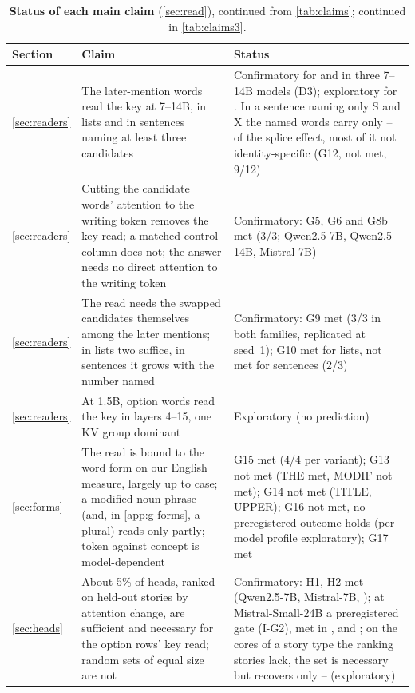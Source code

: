 \begin{table}[p]
\centering
\footnotesize
\caption{\textbf{Status of each main claim} (\cref{sec:read}), continued from \cref{tab:claims}; continued in \cref{tab:claims3}.}
\label{tab:claims2}
\begin{tabular}{p{}p{}p{}}
\toprule
Section & Claim & Status \\
\midrule
\cref{sec:readers} & The later-mention words read the key at 7--14B, in lists and in sentences naming at least three candidates & Confirmatory for \fmtOpt{} and \fmtPost{} in three 7--14B models (D3); exploratory for \fmtLetter{}. In a sentence naming only S and X the named words carry only \GtwelveStwoQwenFourteen{}--\GtwelveStwoQwenSeven{} of the splice effect, most of it not identity-specific (G12, not met, 9/12) \\
\cref{sec:readers} & Cutting the candidate words' attention to the writing token removes the key read; a matched control column does not; the answer needs no direct attention to the writing token & Confirmatory: G5, G6 and G8b met (3/3; Qwen2.5-7B, Qwen2.5-14B, Mistral-7B) \\
\cref{sec:readers} & The read needs the swapped candidates themselves among the later mentions; in lists two suffice, in sentences it grows with the number named & Confirmatory: G9 met (3/3 in both families, replicated at seed~1); G10 met for lists, not met for sentences (2/3) \\
\cref{sec:readers} & At 1.5B, option words read the key in layers 4--15, one KV group dominant & Exploratory (no prediction) \\
\cref{sec:forms} & The read is bound to the word form on our English measure, largely up to case; a modified noun phrase (and, in \cref{app:g-forms}, a plural) reads only partly; token against concept is model-dependent & G15 met (4/4 per variant); G13 not met (THE met, MODIF not met); G14 not met (TITLE, UPPER); G16 not met, no preregistered outcome holds (per-model profile exploratory); G17 met \\
\cref{sec:heads} & About 5\% of heads, ranked on held-out stories by attention change, are sufficient and necessary for the option rows' key read; random sets of equal size are not & Confirmatory: H1, H2 met (Qwen2.5-7B, Mistral-7B, \fmtOpt{}); at Mistral-Small-24B a preregistered gate (I-G2), met in \fmtOpt{}, \fmtLetter{} and \fmtPost{}; on the \InDist{} cores of a story type the ranking stories lack, the set is necessary but recovers only \IrSixtyfourDistLetter{}--\IrSixtyfourDistPost{} (exploratory) \\

\end{tabular}
\end{table}
